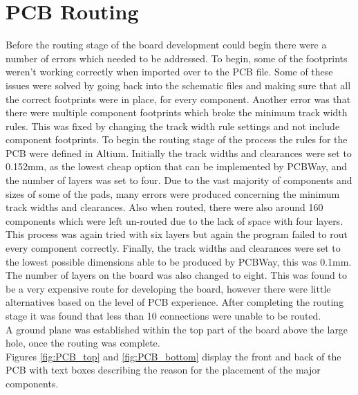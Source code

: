 
\section{PCB Routing}
\label{chap6sec6}

	Before the routing stage of the board development could begin there were a number of errors which needed to be addressed. 
To begin, some of the footprints weren't working correctly when imported over to the PCB file. 
Some of these issues were solved by going back into the schematic files and making sure that all the correct footprints were in place, for every component. 
Another error was that there were multiple component footprints which broke the minimum track width rules. 
This was fixed by changing the track width rule settings and not include component footprints.
	To begin the routing stage of the process the rules for the PCB were defined in Altium. 
Initially the track widths and clearances were set to 0.152mm, as the lowest cheap option that can be implemented by PCBWay, and the number of layers was set to four. 
Due to the vast majority of components and sizes of some of the pads, many errors were produced concerning the minimum track widths and clearances. 
Also when routed, there were also around 160 components which were left un-routed due to the lack of space with four layers. 
This process was again tried with six layers but again the program failed to rout every component correctly. 
Finally, the track widths and clearances were set to the lowest possible dimensions able to be produced by PCBWay, this was 0.1mm. 
The number of layers on the board was also changed to eight. 
This was found to be a very expensive route for developing the board, however there were little alternatives based on the level of PCB experience. 
After completing the routing stage it was found that less than 10 connections were unable to be routed.\\
A ground plane was established within the top part of the board above the large hole, once the routing was complete. \\
Figures \ref{fig:PCB_top} and \ref{fig:PCB_bottom} display the front and back of the PCB with text boxes describing the reason for the placement of the major components. 

